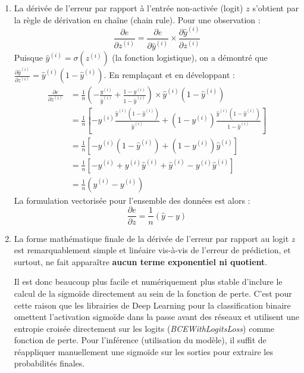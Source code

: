 \documentclass[]{../exercices}
\begin{document}
\begin{solution}
\begin{enumerate}
    \item La dérivée de l'erreur par rapport à l'entrée non-activée (logit) $z$ s'obtient par la règle de dérivation en chaîne (chain rule). Pour une observation :
    \begin{equation*}
        \frac{\partial e}{\partial z^{(i)}} = \frac{\partial e}{\partial \hat{y}^{(i)}} \times \frac{\partial \hat{y}^{(i)}}{\partial z^{(i)}}
    \end{equation*}
    Puisque $\hat{y}^{(i)} = \sigma(z^{(i)})$ (la fonction logistique), on a démontré que $\frac{\partial \hat{y}^{(i)}}{\partial z^{(i)}} = \hat{y}^{(i)} (1 - \hat{y}^{(i)})$. En remplaçant et en développant :
    \begin{align*}
        \frac{\partial e}{\partial z^{(i)}} &= \frac{1}{n} \left( - \frac{y^{(i)}}{\hat{y}^{(i)}} + \frac{1 - y^{(i)}}{1 - \hat{y}^{(i)}} \right) \times \hat{y}^{(i)} (1 - \hat{y}^{(i)}) \\
        &= \frac{1}{n} \left[ - y^{(i)} \frac{\hat{y}^{(i)} (1 - \hat{y}^{(i)})}{\hat{y}^{(i)}} + (1 - y^{(i)}) \frac{\hat{y}^{(i)} (1 - \hat{y}^{(i)})}{1 - \hat{y}^{(i)}} \right] \\
        &= \frac{1}{n} \left[ -y^{(i)} (1 - \hat{y}^{(i)}) + (1 - y^{(i)}) \hat{y}^{(i)} \right] \\
        &= \frac{1}{n} \left[ -y^{(i)} + y^{(i)} \hat{y}^{(i)} + \hat{y}^{(i)} - y^{(i)} \hat{y}^{(i)} \right] \\
        &= \frac{1}{n} \left( \hat{y}^{(i)} - y^{(i)} \right)
    \end{align*}
    La formulation vectorisée pour l'ensemble des données est alors :
    \begin{equation*}
        \frac{\partial e}{\partial z} = \frac{1}{n}(\hat{y} - y)
    \end{equation*}

    \item La forme mathématique finale de la dérivée de l'erreur par rapport au logit $z$ est remarquablement simple et linéaire vis-à-vis de l'erreur de prédiction, et surtout, ne fait apparaître \textbf{aucun terme exponentiel ni quotient}. 
    
    Il est donc beaucoup plus facile et numériquement plus stable d'inclure le calcul de la sigmoïde directement au sein de la fonction de perte. C'est pour cette raison que les librairies de Deep Learning pour la classification binaire omettent l'activation sigmoïde dans la passe avant des réseaux et utilisent une entropie croisée directement sur les logits (\textit{BCEWithLogitsLoss}) comme fonction de perte. Pour l'inférence (utilisation du modèle), il suffit de réappliquer manuellement une sigmoïde sur les sorties pour extraire les probabilités finales.
\end{enumerate}
\end{solution}
\end{document}
